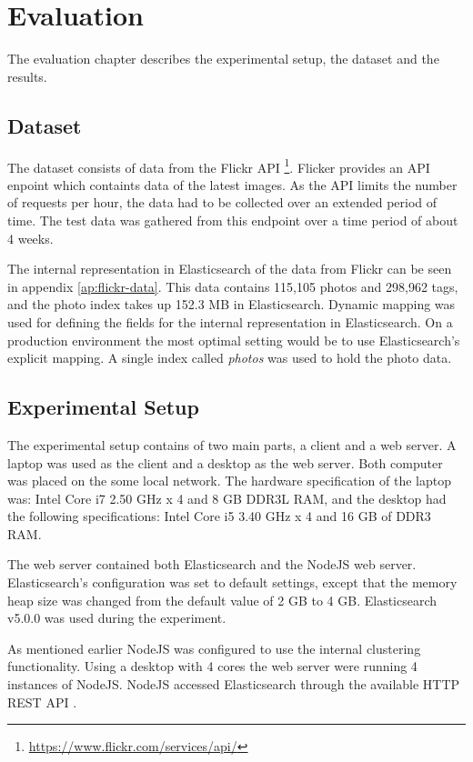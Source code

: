 \chapter{Evaluation}
\label{ch:evaluation}
The evaluation chapter describes the experimental setup, the dataset and the results.

\section{Dataset}
The dataset consists of data from the Flickr API \footnote{\url{https://www.flickr.com/services/api/}}.
Flicker provides an API enpoint which containts data of the latest images.
As the API limits the number of requests per hour, the data had to be collected over an extended period of time.
The test data was gathered from this endpoint over a time period of about 4 weeks.

The internal representation in Elasticsearch of the data from Flickr can be seen in appendix \ref{ap:flickr-data}.
This data contains 115,105 photos and 298,962 tags, and the photo index takes up 152.3 MB in Elasticsearch.
Dynamic mapping was used for defining the fields for the internal representation in Elasticsearch.
On a production environment the most optimal setting would be to use Elasticsearch's explicit mapping.
A single index called \textit{photos} was used to hold the photo data.

\section{Experimental Setup}
The experimental setup contains of two main parts, a client and a web server.
A laptop was used as the client and a desktop as the web server.
Both computer was placed on the some local network.
The hardware specification of the laptop was: Intel Core i7 2.50 GHz x 4 and 8 GB DDR3L RAM,
and the desktop had the following specifications: Intel Core i5 3.40 GHz x 4 and 16 GB of DDR3 RAM.

The web server contained both Elasticsearch and the NodeJS web server.
Elasticsearch's configuration was set to default settings,
except that the memory heap size was changed from the default value of 2 GB to 4 GB.
Elasticsearch v5.0.0 was used during the experiment.

As mentioned earlier NodeJS was configured to use the internal clustering functionality.
Using a desktop with 4 cores the web server were running 4 instances of NodeJS.
NodeJS accessed Elasticsearch through the available HTTP REST API \cite{elasticsearch-rest-api}.

